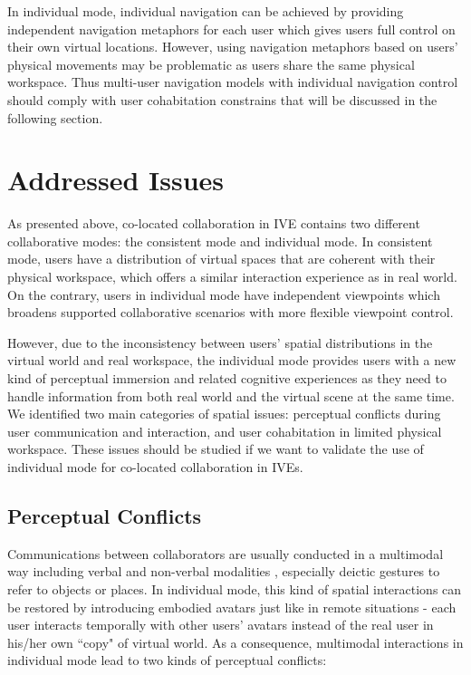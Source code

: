 In individual mode, individual navigation can be achieved by providing independent navigation metaphors for each user which gives users full control on their own virtual locations. However, using navigation metaphors based on users' physical movements may be problematic as users share the same physical workspace. Thus multi-user navigation models with individual navigation control should comply with user cohabitation constrains that will be discussed in the following section.



\section{Addressed Issues}
As presented above, co-located collaboration in IVE contains two different collaborative modes: the consistent mode and individual mode. In consistent mode, users have a distribution of virtual spaces that are coherent with their physical workspace, which offers a similar interaction experience as in real world. On the contrary, users in individual mode have independent viewpoints which broadens supported collaborative scenarios with more flexible viewpoint control.

However, due to the inconsistency between users' spatial distributions in the virtual world and real workspace, the individual mode provides users with a new kind of perceptual immersion and related cognitive experiences as they need to handle information from both real world and the virtual scene at the same time. We identified two main categories of spatial issues: perceptual conflicts during user communication and interaction, and user cohabitation in limited physical workspace. These issues should be studied if we want to validate the use of individual mode for co-located collaboration in IVEs. 


\subsection{Perceptual Conflicts}
Communications between collaborators are usually conducted in a multimodal way \citep{Paggio2005Multimodal} including verbal and non-verbal modalities \citep{Ennis2010Seeing, Dodds2011Talk}, especially deictic gestures to refer to objects or places. In individual mode, this kind of spatial interactions can be restored by introducing embodied avatars just like in remote situations - each user interacts temporally with other users' avatars instead of the real user in his/her own ``copy" of virtual world.  As a consequence, multimodal interactions in individual mode lead to two kinds of perceptual conflicts:

